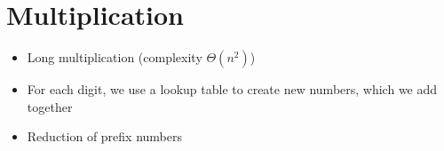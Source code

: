 \section{Multiplication}

\begin{itemize}
  \item Long multiplication (complexity $\Theta(n^2)$)
  \item For each digit, we use a lookup table to create new numbers, which we add together
  \item Reduction of prefix numbers
\end{itemize}
